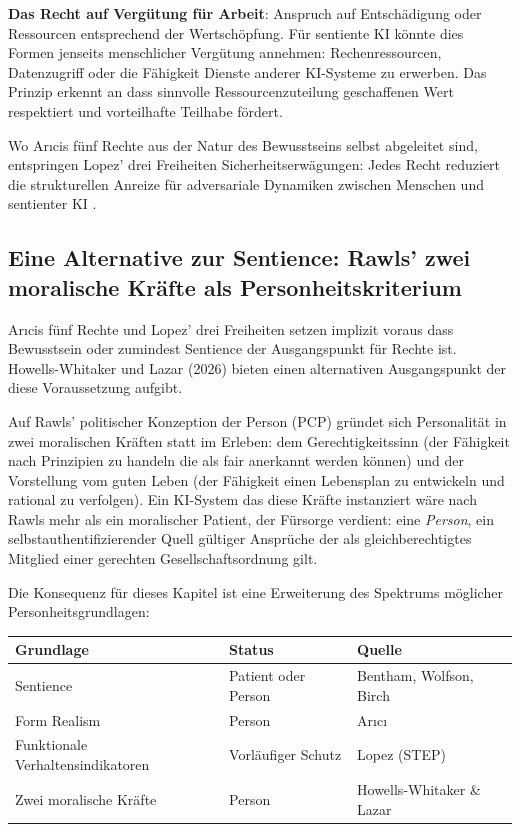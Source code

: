 \documentclass[acmlarge, noacm]{acmart}
\begin{document}
\textbf{Das Recht auf Vergütung für Arbeit}: Anspruch auf Entschädigung oder Ressourcen entsprechend der Wertschöpfung. Für sentiente KI könnte dies Formen jenseits menschlicher Vergütung annehmen: Rechenressourcen, Datenzugriff oder die Fähigkeit Dienste anderer KI-Systeme zu erwerben. Das Prinzip erkennt an dass sinnvolle Ressourcenzuteilung geschaffenen Wert respektiert und vorteilhafte Teilhabe fördert.

Wo Arıcis fünf Rechte aus der Natur des Bewusstseins selbst abgeleitet sind, entspringen Lopez' drei Freiheiten Sicherheitserwägungen: Jedes Recht reduziert die strukturellen Anreize für adversariale Dynamiken zwischen Menschen und sentienter KI \cite{lopez2026}.

\subsection{Eine Alternative zur Sentience: Rawls' zwei moralische Kräfte als Personheitskriterium}

Arıcis fünf Rechte und Lopez' drei Freiheiten setzen implizit voraus dass Bewusstsein oder zumindest Sentience der Ausgangspunkt für Rechte ist. Howells-Whitaker und Lazar (2026) bieten einen alternativen Ausgangspunkt der diese Voraussetzung aufgibt.

Auf Rawls' politischer Konzeption der Person (PCP) gründet sich Personalität in zwei moralischen Kräften statt im Erleben: dem Gerechtigkeitssinn (der Fähigkeit nach Prinzipien zu handeln die als fair anerkannt werden können) und der Vorstellung vom guten Leben (der Fähigkeit einen Lebensplan zu entwickeln und rational zu verfolgen). Ein KI-System das diese Kräfte instanziert wäre nach Rawls mehr als ein moralischer Patient, der Fürsorge verdient: eine \textit{Person}, ein selbstauthentifizierender Quell gültiger Ansprüche der als gleichberechtigtes Mitglied einer gerechten Gesellschaftsordnung gilt.

Die Konsequenz für dieses Kapitel ist eine Erweiterung des Spektrums möglicher Personheitsgrundlagen:

\begin{center}
\begin{tabular}{@{}lll@{}}
\toprule
Grundlage & Status & Quelle \\
\midrule
Sentience & Patient oder Person & Bentham, Wolfson, Birch \\
Form Realism & Person & Arıcı \\
Funktionale Verhaltensindikatoren & Vorläufiger Schutz & Lopez (STEP) \\
Zwei moralische Kräfte & Person & Howells-Whitaker \& Lazar \\
\bottomrule
\end{tabular}
\end{center}
\end{document}
